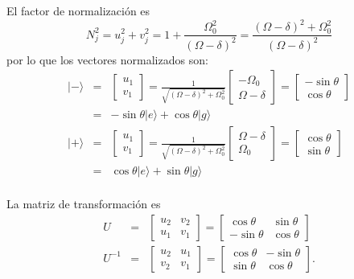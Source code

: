 \documentclass[twocolumn,aps,eqsecnum]{revtex4}
\providecommand{\ket}[1]{\lvert #1 \rangle}
\begin{document}
El factor de normalizaci\'on es $$N_j^2 = u_j^2 +v_j^2 
= 1 + \frac{\Omega_0^2}{(\Omega -\delta)^2} 
  = \frac{(\Omega -\delta)^2 +\Omega_0^2}{(\Omega -\delta)^2}$$
por lo que los vectores normalizados son: 
%
\begin{eqnarray*}
\ket{-} &=& \left[ \begin{array}{c} u_1 \\ v_1 \end{array} \right] 
    = \frac{1}{ \sqrt{(\Omega -\delta)^2 +\Omega_0^2} } 
    \left[ \begin{array}{c} -\Omega_0 \\ \Omega -\delta 
    \end{array} \right] 
    = \left[ \begin{array}{c} -\sin{\theta} \\ \cos{\theta}  
    \end{array} \right]  \\ 
    &=& -\sin{\theta} \ket{e} + \cos{\theta} \ket{g}    \\
%
\ket{+} &=& \left[ \begin{array}{c} u_1 \\ v_1 \end{array} \right] 
    = \frac{1}{ \sqrt{(\Omega -\delta)^2 +\Omega_0^2} } 
    \left[ \begin{array}{c} \Omega -\delta \\ \Omega_0  
    \end{array} \right] 
    = \left[ \begin{array}{c} \cos{\theta} \\ \sin{\theta}  
    \end{array} \right] \\ 
    &=& \cos{\theta} \ket{e} + \sin{\theta} \ket{g}    \\
\end{eqnarray*}

La matriz de  transformaci\'on es 
%
\begin{eqnarray*}
U &=& \left[ \begin{array}{cc} u_2 & v_2 \\ 
    u_1 & v_1 \end{array} \right]  
    = \left[ \begin{array}{cc} \cos{\theta} & \sin{\theta} \\ 
    -\sin{\theta} & \cos{\theta} \end{array} \right]     \\ 
U^{-1} &=& \left[ \begin{array}{cc} u_2 & u_1 \\ 
    v_2 & v_1 \end{array} \right]  
    = \left[ \begin{array}{cc} \cos{\theta} & -\sin{\theta} \\ 
    \sin{\theta} & \cos{\theta} \end{array} \right] . 
\end{eqnarray*}
\end{document}

